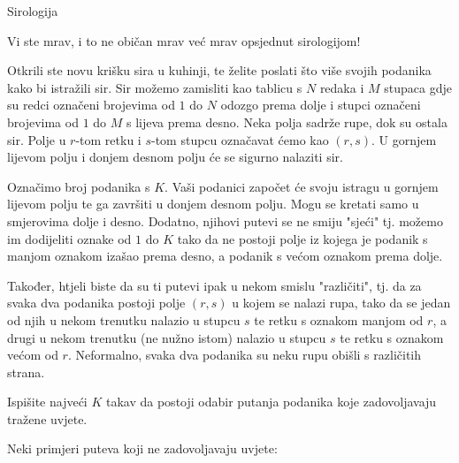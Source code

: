 \begin{statement}[
  problempoints=100,
  timelimit=1 sekunda,
  memorylimit=1024 MiB,
]{Sirologija}

Vi ste mrav, i to ne običan mrav već mrav opsjednut sirologijom!

Otkrili ste novu krišku sira u kuhinji, te želite poslati što više svojih podanika kako bi istražili sir. Sir možemo zamisliti kao tablicu s $N$ redaka i $M$ stupaca gdje su redci označeni brojevima od $1$ do $N$ odozgo prema dolje i stupci označeni brojevima od $1$ do $M$ s lijeva prema desno. Neka polja sadrže rupe, dok su ostala sir. Polje u $r$-tom retku i $s$-tom stupcu označavat ćemo kao $(r, s)$. U gornjem lijevom polju i donjem desnom polju će se sigurno nalaziti sir.

Označimo broj podanika s $K$. Vaši podanici započet će svoju istragu u gornjem lijevom polju te ga završiti u donjem desnom polju. Mogu se kretati samo u smjerovima dolje i desno. Dodatno, njihovi putevi se ne smiju "sjeći" tj. možemo im dodijeliti oznake od $1$ do $K$ tako da ne postoji polje iz kojega je podanik s manjom oznakom izašao prema desno, a podanik s većom oznakom prema dolje.

Također, htjeli biste da su ti putevi ipak u nekom smislu "različiti", tj. da za svaka dva podanika postoji polje $(r, s)$ u kojem se nalazi rupa, tako da se jedan od njih u nekom trenutku nalazio u stupcu $s$ te retku s oznakom manjom od $r$, a drugi u nekom trenutku (ne nužno istom) nalazio u stupcu $s$ te retku s oznakom većom od $r$. Neformalno, svaka dva podanika su neku rupu obišli s različitih strana.

Ispišite najveći $K$ takav da postoji odabir putanja podanika koje zadovoljavaju tražene uvjete.

Neki primjeri puteva koji ne zadovoljavaju uvjete:


\end{statement}
